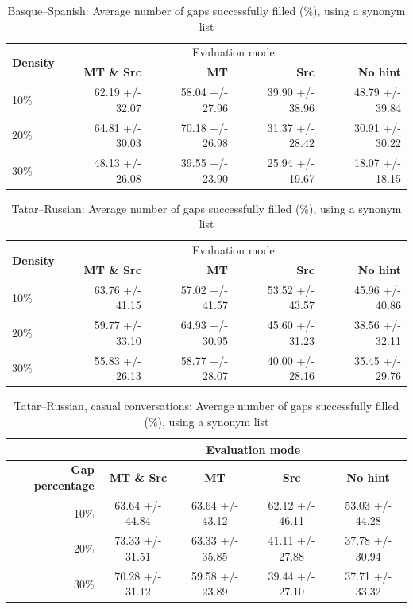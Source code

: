 \documentclass[11pt]{article}
\begin{document}

\begin{table}
\centering
  \begin{tabular}{|l|r|r|r|r|}
  \hline
 \multirow{2}{*}{\textbf{Density}} & \multicolumn{4}{|c|}{Evaluation mode} \\\cline{2-5}
                                            & \textbf{MT \& Src} & \textbf{MT} & \textbf{Src} & \textbf{No hint} \\
\hline
10\%&62.19 +/- 32.07&58.04 +/- 27.96&39.90 +/- 38.96&48.79 +/- 39.84\\
20\%&64.81 +/- 30.03&70.18 +/- 26.98&31.37 +/- 28.42&30.91 +/- 30.22\\
30\%&48.13 +/- 26.08&39.55 +/- 23.90&25.94 +/- 19.67&18.07 +/- 18.15\\
\hline
\end{tabular}
\caption {Basque--Spanish: Average number of gaps successfully filled (\%), using a synonym list} \label{table:res-eus-spa}
\end{table}

\begin{table}
\centering
  \begin{tabular}{|l|r|r|r|r|}
    \hline
    \multirow{2}{*}{\textbf{Density}} & \multicolumn{4}{|c|}{Evaluation mode} \\\cline{2-5}
                                            & \textbf{MT \& Src} & \textbf{MT} & \textbf{Src} & \textbf{No hint} \\
\hline
10\%&63.76 +/- 41.15&57.02 +/- 41.57&53.52 +/- 43.57&45.96 +/- 40.86\\
20\%&59.77 +/- 33.10&64.93 +/- 30.95&45.60 +/- 31.23&38.56 +/- 32.11\\
30\%&55.83 +/- 26.13&58.77 +/- 28.07&40.00 +/- 28.16&35.45 +/- 29.76\\
    \hline
  \end{tabular}
  \caption{Tatar--Russian: Average number of gaps successfully filled (\%), using a synonym list}
  \label{table:res-tat-rus}
\end{table}


\begin{table}

\centering
\begin{tabular}{|r |*{4}{c}|}
\hline
  &\multicolumn{4}{c|}{\textbf{Evaluation mode}}\\
\hline
\textbf{Gap percentage} & \textbf{MT \& Src} & \textbf{MT} & \textbf{Src} & \textbf{No hint} \\
10\%&63.64 +/- 44.84&63.64 +/- 43.12&62.12 +/- 46.11&53.03 +/- 44.28\\
20\%&73.33 +/- 31.51&63.33 +/- 35.85&41.11 +/- 27.88&37.78 +/- 30.94\\
30\%&70.28 +/- 31.12&59.58 +/- 23.89&39.44 +/- 27.10&37.71 +/- 33.32\\
\hline
\end{tabular}
\caption {Tatar--Russian, casual conversations: Average number of gaps successfully filled (\%), using a synonym list} \label{table:rus-casual} 
\end{table}
\end{document}
